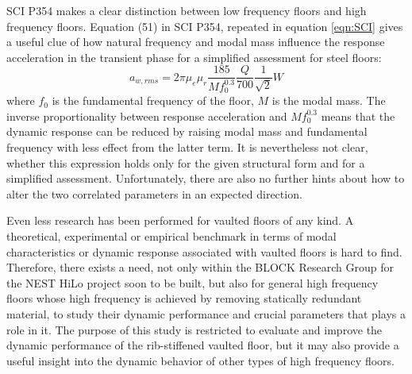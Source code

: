 SCI P354 makes a clear distinction between low frequency floors and high frequency floors. Equation (51) in SCI P354, repeated in equation \ref{eqn:SCI} gives a useful clue of how natural frequency and modal mass influence the response acceleration in the transient phase for a simplified assessment for steel floors:
\begin{equation}
    a_{w,rms} = 2\pi\mu_e\mu_r\frac{185}{Mf_0^{0.3}}\frac{Q}{700}\frac{1}{\sqrt{2}}W
\label{eqn:SCI}
\end{equation}
\noindent
where $f_0$ is the fundamental frequency of the floor, $M$ is the modal mass. The inverse proportionality between response acceleration and $Mf_0^{0.3}$ means that the dynamic response can be reduced by raising modal mass and fundamental frequency with less effect from the latter term. It is nevertheless not clear, whether this expression holds only for the given structural form and for a simplified assessment. Unfortunately, there are also no further hints about how to alter the two correlated parameters in an expected direction.

Even less research has been performed for vaulted floors of any kind. A theoretical, experimental or empirical benchmark in terms of modal characteristics or dynamic response associated with vaulted floors is hard to find. Therefore, there exists a need, not only within the BLOCK Research Group for the NEST HiLo project soon to be built, but also for general high frequency floors whose high frequency is achieved by removing statically redundant material, to study their dynamic performance and crucial parameters that plays a role in it. The purpose of this study is restricted to evaluate and improve the dynamic performance of the rib-stiffened vaulted floor, but it may also provide a useful insight into the dynamic behavior of other types of high frequency floors.
